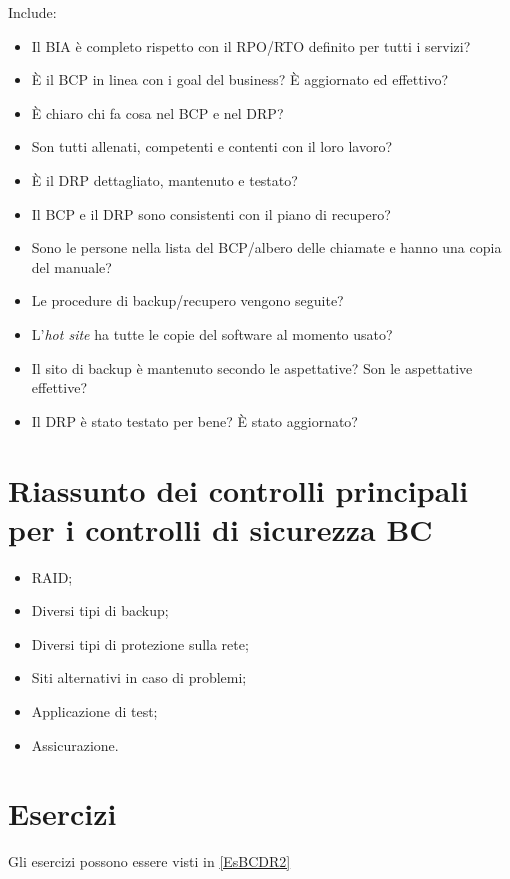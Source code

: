Include:
\begin{itemize}
  \item Il BIA è completo rispetto con il RPO/RTO definito per tutti i servizi?
  \item È il BCP in linea con i goal del business? È aggiornato ed effettivo?
  \item È chiaro chi fa cosa nel BCP e nel DRP?
  \item Son tutti allenati, competenti e contenti con il loro lavoro?
  \item È il DRP dettagliato, mantenuto e testato?
  \item Il BCP e il DRP sono consistenti con il piano di recupero?
  \item Sono le persone nella lista del BCP/albero delle chiamate e hanno una
    copia del manuale?
  \item Le procedure di backup/recupero vengono seguite?
  \item L'\textit{hot site} ha tutte le copie del software al momento usato?
  \item Il sito di backup è mantenuto secondo le aspettative? Son le aspettative
    effettive?
  \item Il DRP è stato testato per bene? È stato aggiornato?
\end{itemize}


\section{Riassunto dei controlli principali per i controlli di sicurezza BC}

\begin{itemize}
  \item RAID;
  \item Diversi tipi di backup;
  \item Diversi tipi di protezione sulla rete;
  \item Siti alternativi in caso di problemi;
  \item Applicazione di test;
  \item Assicurazione.
\end{itemize}

\section{Esercizi}

Gli esercizi possono essere visti in \ref{EsBCDR2}
